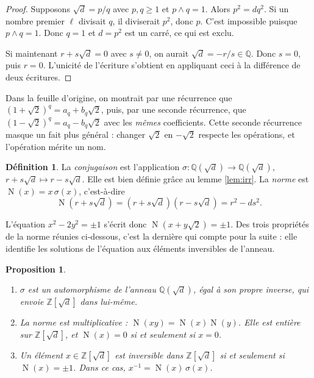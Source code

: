 \documentclass[11pt,a4paper]{article}
\theoremstyle{plain}
\newtheorem{proposition}[theoreme]{Proposition}
\theoremstyle{definition}
\newtheorem{definition}[theoreme]{Définition}
\theoremstyle{remark}
\newcommand{\Z}{\mathbb{Z}}
\newcommand{\Q}{\mathbb{Q}}
\newcommand{\pgcd}{\wedge}
\DeclareMathOperator{\Nm}{N}
\begin{document}
\begin{proof}
Supposons $\sqrt d=p/q$ avec $p,q\geq1$ et $p\pgcd q=1$. Alors $p^2=dq^2$. Si un nombre premier $\ell$ divisait $q$, il diviserait $p^2$, donc $p$. C'est impossible puisque $p\pgcd q=1$. Donc $q=1$ et $d=p^2$ est un carré, ce qui est exclu.

Si maintenant $r+s\sqrt d=0$ avec $s\neq0$, on aurait $\sqrt d=-r/s\in\Q$. Donc $s=0$, puis $r=0$. L'unicité de l'écriture s'obtient en appliquant ceci à la différence de deux écritures.
\end{proof}

Dans la feuille d'origine, on montrait par une récurrence que $(1+\sqrt2)^q=a_q+b_q\sqrt2$, puis, par une seconde récurrence, que $(1-\sqrt2)^q=a_q-b_q\sqrt2$ avec les \emph{mêmes} coefficients. Cette seconde récurrence masque un fait plus général : changer $\sqrt2$ en $-\sqrt2$ respecte les opérations, et l'opération mérite un nom.

\begin{definition}
La \emph{conjugaison} est l'application $\sigma:\Q(\sqrt d)\to\Q(\sqrt d)$, $r+s\sqrt d\mapsto r-s\sqrt d$. Elle est bien définie grâce au lemme \ref{lem:irr}. La \emph{norme} est $\Nm(x)=x\,\sigma(x)$, c'est-à-dire
\[
  \Nm(r+s\sqrt d)=(r+s\sqrt d)(r-s\sqrt d)=r^2-ds^2 .
\]
\end{definition}

L'équation $x^2-2y^2=\pm1$ s'écrit donc $\Nm(x+y\sqrt2)=\pm1$. Des trois propriétés de la norme réunies ci-dessous, c'est la dernière qui compte pour la suite : elle identifie les solutions de l'équation aux éléments inversibles de l'anneau.

\begin{proposition}\label{prop:norme}
\begin{enumerate}[nosep]
\item $\sigma$ est un automorphisme de l'anneau $\Q(\sqrt d)$, égal à son propre inverse, qui envoie $\Z[\sqrt d]$ dans lui-même.
\item La norme est multiplicative : $\Nm(xy)=\Nm(x)\Nm(y)$. Elle est entière sur $\Z[\sqrt d]$, et $\Nm(x)=0$ si et seulement si $x=0$.
\item Un élément $x\in\Z[\sqrt d]$ est inversible dans $\Z[\sqrt d]$ si et seulement si $\Nm(x)=\pm1$. Dans ce cas, $x^{-1}=\Nm(x)\,\sigma(x)$.
\end{enumerate}
\end{proposition}
\end{document}
